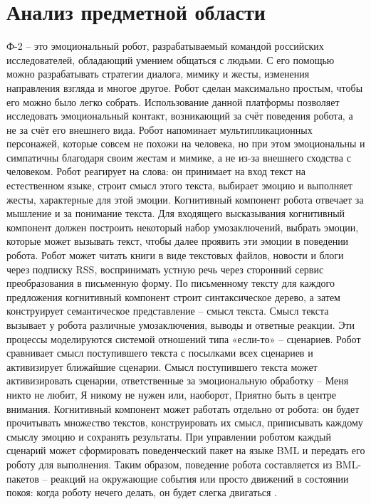 \chapter{Анализ предметной области}
Ф-2 – это эмоциональный робот, разрабатываемый командой российских исследователей, обладающий умением общаться с людьми. С его помощью можно разрабатывать стратегии диалога, мимику и жесты, изменения направления взгляда и многое другое. Робот сделан максимально простым, чтобы его можно было легко собрать. Использование данной платформы позволяет исследовать эмоциональный контакт, возникающий за счёт поведения робота, а не за счёт его внешнего вида. Робот напоминает мультипликационных персонажей, которые совсем не похожи на человека, но при этом эмоциональны и симпатичны благодаря своим жестам и мимике, а не из-за внешнего сходства с человеком. Робот реагирует на слова: он принимает на вход текст на естественном языке, строит смысл этого текста, выбирает эмоцию и выполняет жесты, характерные для этой эмоции. Когнитивный компонент робота отвечает за мышление и за понимание текста. Для входящего высказывания когнитивный компонент должен построить некоторый набор умозаключений, выбрать эмоции, которые может вызывать текст, чтобы далее проявить эти эмоции в поведении робота. Робот может читать книги в виде текстовых файлов, новости и блоги через подписку RSS, воспринимать устную речь через сторонний сервис преобразования в письменную форму. По письменному тексту для каждого предложения когнитивный компонент строит синтаксическое дерево, а затем конструирует семантическое представление – смысл текста. Смысл текста вызывает у робота различные умозаключения, выводы и ответные реакции. Эти процессы моделируются системой отношений типа «если-то» – сценариев. Робот сравнивает смысл поступившего текста с посылками всех сценариев и активизирует ближайшие сценарии. Смысл поступившего текста может активизировать сценарии, ответственные за эмоциональную обработку – Меня никто не любит, Я никому не нужен или, наоборот, Приятно быть в центре внимания. Когнитивный компонент может работать отдельно от робота: он будет прочитывать множество текстов, конструировать их смысл, приписывать каждому смыслу эмоцию и сохранять результаты. При управлении роботом каждый сценарий может сформировать поведенческий пакет на языке BML и передать его роботу для выполнения. Таким образом, поведение робота составляется из BML-пакетов – реакций на окружающие события или просто движений в состоянии покоя: когда роботу нечего делать, он будет слегка двигаться \cite{f2}. \\

